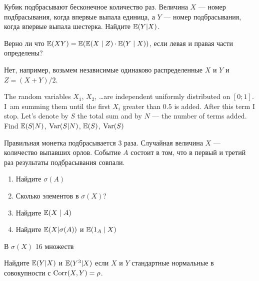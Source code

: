 \begin{problem}
Кубик подбрасывают бесконечное количество раз. Величина $X$ --- номер подбрасывания, когда впервые выпала единица, а $Y$ --- номер подбрасывания, когда впервые выпала шестерка. Найдите $\mathbb{E}(Y|X)$.
\end{problem} 
\begin{solution} 

\end{solution}

\begin{problem}
Верно ли что $\mathbb{E}(XY)=\mathbb{E}(\mathbb{E}(X\mid Z)\cdot \mathbb{E}(Y\mid X))$, если левая и правая части определены?
\end{problem} 
\begin{solution} 
Нет, например, возьмем независимые одинаково распределенные $X$ и $Y$ и $Z=(X+Y)/2$.
\end{solution}

\begin{problem}
The random variables $X_1$, $X_2$, \ldots are independent uniformly distributed on $[0;1]$. I~am summing them until the first $X_i$ greater than $0.5$ is added. After this term I stop. Let's denote by $S$ the total sum and by $N$ --- the number of terms added. Find $\mathbb{E}(S|N)$, $\operatorname{Var}(S|N)$, $\mathbb{E}(S)$, $\operatorname{Var}(S)$
\end{problem} 
\begin{solution} 

\end{solution}

\begin{problem}
 Правильная монетка подбрасывается 3 раза. Случайная величина $X$ --- количество выпавших орлов. Событие $A$ состоит в том, что в первый и третий раз результаты подбрасывания совпали. 
\begin{enumerate}
\item Найдите $\sigma(A)$
\item Сколько элементов в $\sigma(X)$?
\item Найдите $\mathbb{E}(X\mid A)$
\item Найдите $\mathbb{E}(X|\sigma(A))$ и $\mathbb{E}(1_A \mid X)$
\end{enumerate}
\end{problem} 
\begin{solution} 
 В $\sigma(X)$ 16 множеств
\end{solution}

\begin{problem}
Найдите $\mathbb{E}(Y|X)$ и $\mathbb{E}(Y^3|X)$ если $X$ и $Y$ стандартные нормальные в совокупности с $\operatorname{Corr}(X,Y)=\rho$.
\end{problem} 
\begin{solution} 

\end{solution}

